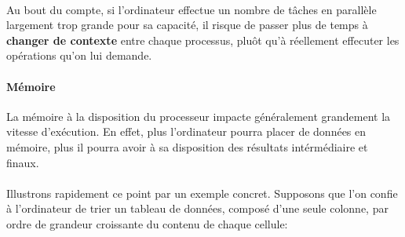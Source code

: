 {  \paragraph{} Au bout du compte, si l'ordinateur effectue un nombre de tâches en parallèle
  largement trop grande pour sa capacité, il risque de passer plus de temps à \textbf{changer de
  contexte} entre chaque processus, pluôt qu'à réellement effecuter les opérations qu'on lui
  demande.

  \paragraph{Mémoire} La mémoire à la disposition du processeur impacte généralement grandement la
  vitesse d'exécution. En effet, plus l'ordinateur pourra placer de données en mémoire, plus il
  pourra avoir à sa disposition des résultats intérmédiaire et finaux.

  \paragraph{} Illustrons rapidement ce point par un exemple concret. Supposons que l'on confie à
  l'ordinateur de trier un tableau de données, composé d'une seule colonne, par ordre de grandeur
  croissante du contenu de chaque cellule:
}
